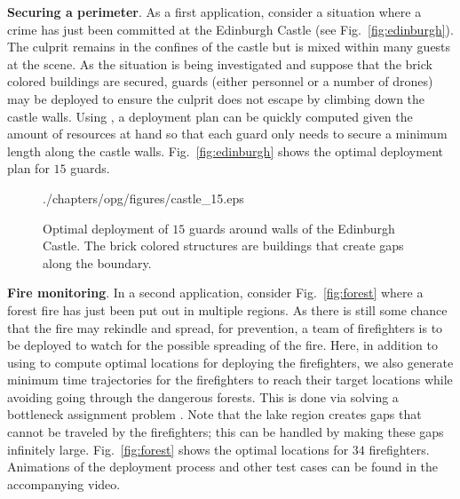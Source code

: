 \noindent\textbf{Securing a perimeter}. As a first application, consider
a situation where a crime has just been committed at the Edinburgh 
Castle (see Fig.~\ref{fig:edinburgh}). The culprit remains in the confines 
of the castle but is mixed within many guests at the scene. As the 
situation is being investigated and suppose that the brick colored 
buildings are secured, guards (either personnel or a number of drones) may 
be deployed to ensure the culprit does not escape by climbing down the 
castle walls. Using \algoSRG, a deployment plan can be quickly computed 
given the amount of resources at hand so that each guard only needs to 
secure a minimum length along the castle walls. Fig.~\ref{fig:edinburgh} 
shows the optimal deployment plan for $15$ guards. 

\begin{figure}[ht]
	\vspace*{-2mm}
	\begin{center}
		\begin{overpic}[width=0.7\textwidth, tics=5]{./chapters/opg/figures/castle_15.eps}
		\end{overpic}
	\end{center}
	\vspace*{-4.5mm}
	\caption{\label{fig:opg-edinburgh} Optimal deployment of $15$ guards around 
	walls of the Edinburgh Castle. The brick colored structures are buildings 
	that create gaps along the boundary.}
\end{figure}

\noindent\textbf{Fire monitoring}. In a second application, consider 
Fig.~\ref{fig:forest} where a forest fire has just been put out in 
multiple regions. As there is still some chance that the fire may 
rekindle and spread, for prevention, a team of firefighters is to be 
deployed to watch for the possible spreading of the fire. Here, in 
addition to using \algoMRG to compute optimal locations for deploying 
the firefighters, we also generate minimum time trajectories for the 
firefighters to reach their target locations while avoiding going 
through the dangerous forests. This is done via solving a bottleneck 
assignment problem \cite{burkard1999linear}.
Note that the lake region creates gaps that cannot be traveled by the 
firefighters; this can be handled by making these gaps infinitely large. 
Fig.~\ref{fig:forest} shows the optimal locations for $34$ firefighters. 
Animations of the deployment process and other test cases can be found 
in the accompanying video. 

